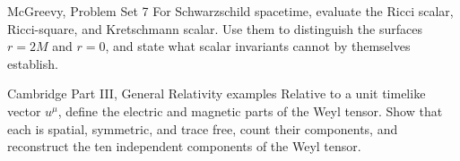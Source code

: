 \begin{exercise}{McGreevy, Problem Set 7}
For Schwarzschild spacetime, evaluate the Ricci scalar, Ricci-square, and
Kretschmann scalar.  Use them to distinguish the surfaces \(r=2M\) and
\(r=0\), and state what scalar invariants cannot by themselves establish.
\end{exercise}

\begin{exercise}{Cambridge Part III, General Relativity examples}
Relative to a unit timelike vector \(u^\mu\), define the electric and magnetic
parts of the Weyl tensor.  Show that each is spatial, symmetric, and trace
free, count their components, and reconstruct the ten independent components
of the Weyl tensor.
\end{exercise}
